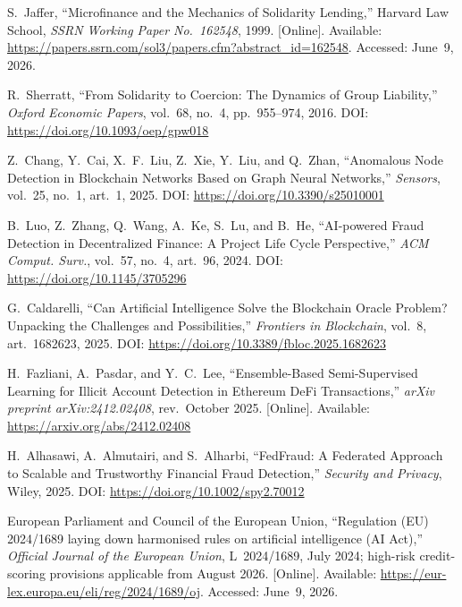 \documentclass[12pt, a4paper]{report}
\begin{document}
{\begin{enumerate}[label={[\arabic*]}]
\item S.~Jaffer, ``Microfinance and the Mechanics of Solidarity Lending,'' Harvard Law School, \textit{SSRN Working Paper No.~162548}, 1999. [Online]. Available: \url{https://papers.ssrn.com/sol3/papers.cfm?abstract_id=162548}. Accessed: June~9, 2026.

\item R.~Sherratt, ``From Solidarity to Coercion: The Dynamics of Group Liability,'' \textit{Oxford Economic Papers}, vol.~68, no.~4, pp.~955--974, 2016. DOI: \url{https://doi.org/10.1093/oep/gpw018}

\item Z.~Chang, Y.~Cai, X.~F.~Liu, Z.~Xie, Y.~Liu, and Q.~Zhan, ``Anomalous Node Detection in Blockchain Networks Based on Graph Neural Networks,'' \textit{Sensors}, vol.~25, no.~1, art.~1, 2025. DOI: \url{https://doi.org/10.3390/s25010001}

\item B.~Luo, Z.~Zhang, Q.~Wang, A.~Ke, S.~Lu, and B.~He, ``AI-powered Fraud Detection in Decentralized Finance: A Project Life Cycle Perspective,'' \textit{ACM Comput. Surv.}, vol.~57, no.~4, art.~96, 2024. DOI: \url{https://doi.org/10.1145/3705296}

\item G.~Caldarelli, ``Can Artificial Intelligence Solve the Blockchain Oracle Problem? Unpacking the Challenges and Possibilities,'' \textit{Frontiers in Blockchain}, vol.~8, art.~1682623, 2025. DOI: \url{https://doi.org/10.3389/fbloc.2025.1682623}

\item H.~Fazliani, A.~Pasdar, and Y.~C.~Lee, ``Ensemble-Based Semi-Supervised Learning for Illicit Account Detection in Ethereum DeFi Transactions,'' \textit{arXiv preprint arXiv:2412.02408}, rev.~October 2025. [Online]. Available: \url{https://arxiv.org/abs/2412.02408}

\item H.~Alhasawi, A.~Almutairi, and S.~Alharbi, ``FedFraud: A Federated Approach to Scalable and Trustworthy Financial Fraud Detection,'' \textit{Security and Privacy}, Wiley, 2025. DOI: \url{https://doi.org/10.1002/spy2.70012}

\item European Parliament and Council of the European Union, ``Regulation (EU) 2024/1689 laying down harmonised rules on artificial intelligence (AI Act),'' \textit{Official Journal of the European Union}, L~2024/1689, July 2024; high-risk credit-scoring provisions applicable from August 2026. [Online]. Available: \url{https://eur-lex.europa.eu/eli/reg/2024/1689/oj}. Accessed: June~9, 2026.


\end{enumerate}}
\end{document}
